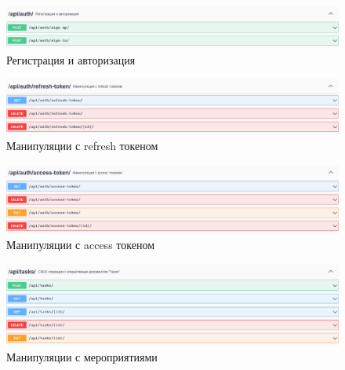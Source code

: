 \begin{figure}[!p]
  \centering

  \includegraphics[width=18cm]
  {images/api-auth.png}

  \caption{Регистрация и авторизация}
  \label{fig:SwaggerApiAuth}
\end{figure}

\begin{figure}[!p]
  \centering

  \includegraphics[width=18cm]
  {images/api-auth-refresh-token.png}

  \caption{Манипуляции с refresh токеном}
  \label{fig:SwaggerApiAuthRefreshToken}
\end{figure}

\begin{figure}[!p]
  \centering

  \includegraphics[width=18cm]
  {images/api-auth-access-token.png}

  \caption{Манипуляции с access токеном}
  \label{fig:SwaggerApiAuthAccessToken}
\end{figure}

\begin{figure}[!p]
  \centering

  \includegraphics[width=18cm]
  {images/api-tasks.png}

  \caption{Манипуляции с мероприятиями}
  \label{fig:SwaggerApiTasks}
\end{figure}


